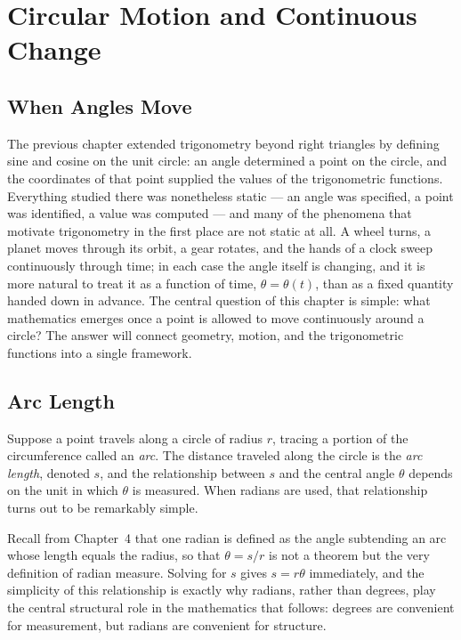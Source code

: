 \chapter{Circular Motion and Continuous Change}
\label{ch:ch05-circular-motion}

\section{When Angles Move}

The previous chapter extended trigonometry beyond right triangles by
defining sine and cosine on the unit circle: an angle determined a point on
the circle, and the coordinates of that point supplied the values of the
trigonometric functions. Everything studied there was nonetheless static ---
an angle was specified, a point was identified, a value was computed --- and
many of the phenomena that motivate trigonometry in the first place are not
static at all. A wheel turns, a planet moves through its orbit, a gear
rotates, and the hands of a clock sweep continuously through time; in each
case the angle itself is changing, and it is more natural to treat it as a
function of time, $\theta = \theta(t)$, than as a fixed quantity handed down
in advance. The central question of this chapter is simple: what
mathematics emerges once a point is allowed to move continuously around a
circle? The answer will connect geometry, motion, and the trigonometric
functions into a single framework.

\section{Arc Length}

Suppose a point travels along a circle of radius $r$, tracing a portion of
the circumference called an \emph{arc}. The distance traveled along the
circle is the \emph{arc length}, denoted $s$, and the relationship between
$s$ and the central angle $\theta$ depends on the unit in which $\theta$ is
measured. When radians are used, that relationship turns out to be
remarkably simple.

Recall from Chapter~4 that one radian is defined as the angle subtending an
arc whose length equals the radius, so that $\theta = s/r$ is not a theorem
but the very definition of radian measure. Solving for $s$ gives $s =
r\theta$ immediately, and the simplicity of this relationship is exactly
why radians, rather than degrees, play the central structural role in the
mathematics that follows: degrees are convenient for measurement, but
radians are convenient for structure.

